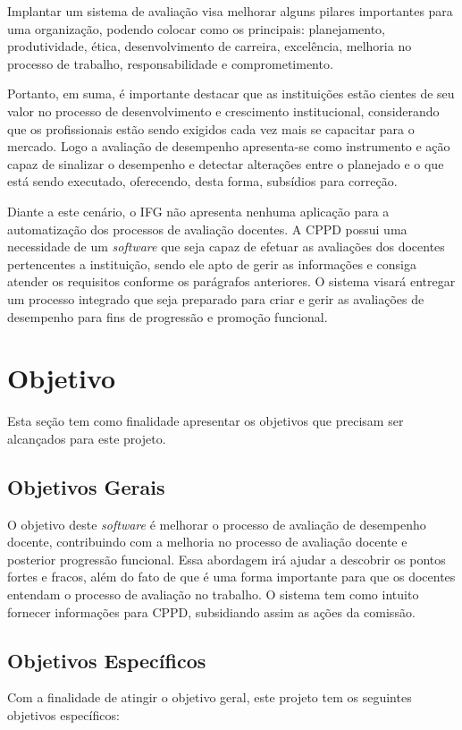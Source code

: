     Implantar um sistema de avaliação visa melhorar alguns pilares importantes para uma organização, podendo colocar como os principais: planejamento, produtividade, ética, desenvolvimento de carreira, excelência, melhoria no processo de trabalho, responsabilidade e comprometimento.
    
    Portanto, em suma, é importante destacar que as instituições estão cientes de seu valor no processo de desenvolvimento e crescimento institucional, considerando que os profissionais estão sendo exigidos cada vez mais se capacitar para o mercado. Logo a avaliação de desempenho apresenta-se como instrumento e ação capaz de sinalizar o desempenho e detectar alterações entre o planejado e o que está sendo executado, oferecendo, desta forma, subsídios para correção.

    Diante a este cenário, o IFG não apresenta nenhuma aplicação para a automatização dos processos de avaliação docentes. A CPPD possui uma necessidade de um \textit{software} que seja capaz de efetuar as avaliações dos docentes pertencentes a instituição, sendo ele apto de gerir as informações e consiga atender os requisitos conforme os parágrafos anteriores. O sistema visará entregar um processo integrado que seja preparado para criar e gerir as avaliações de desempenho para fins de progressão e promoção funcional.

\section{Objetivo} \label{Objetivos}
    Esta seção tem como finalidade apresentar os objetivos que precisam ser alcançados para este projeto.

\subsection{Objetivos Gerais} \label{Objetivos Gerais}
    O objetivo deste \textit{software} é melhorar o processo de avaliação de desempenho docente, contribuindo com a melhoria no processo de avaliação docente e posterior progressão funcional. Essa abordagem irá ajudar a descobrir os pontos fortes e fracos, além do fato de que é uma forma importante para que os docentes entendam o processo de avaliação no trabalho. O sistema tem como intuito fornecer informações para CPPD, subsidiando assim as ações da comissão. 


\subsection{Objetivos Específicos} \label{Objetivos Específicos}
    Com a finalidade de atingir o objetivo geral, este projeto tem os seguintes objetivos específicos:

